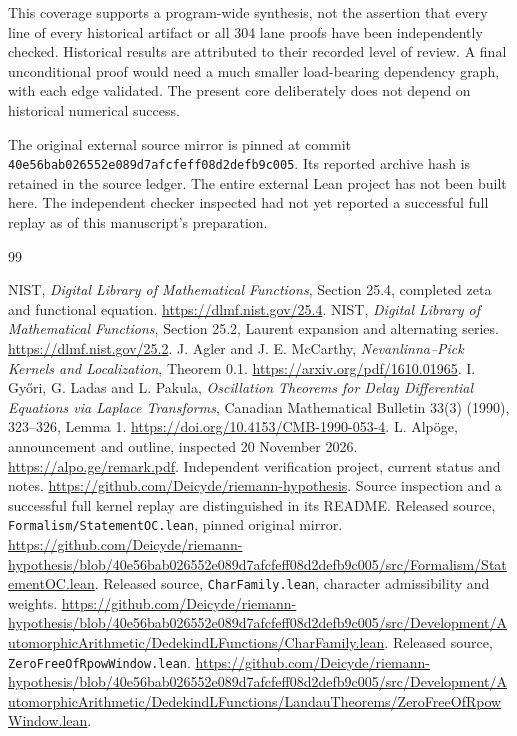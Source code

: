 \documentclass[11pt,letterpaper]{article}
\theoremstyle{definition}
\theoremstyle{remark}
\numberwithin{equation}{section}
\begin{document}
This coverage supports a program-wide synthesis, not the assertion that every line of every historical artifact or all 304 lane proofs have been independently checked. Historical results are attributed to their recorded level of review. A final unconditional proof would need a much smaller load-bearing dependency graph, with each edge validated. The present core deliberately does not depend on historical numerical success.

The original external source mirror is pinned at commit
\nolinkurl{40e56bab026552e089d7afcfeff08d2defb9c005}. Its reported archive hash is retained in the source ledger. The entire external Lean project has not been built here. The independent checker inspected had not yet reported a successful full replay as of this manuscript's preparation.

\begin{thebibliography}{99}
\raggedright
{} NIST, \emph{Digital Library of Mathematical Functions}, Section 25.4, completed zeta and functional equation. \url{https://dlmf.nist.gov/25.4}.
 NIST, \emph{Digital Library of Mathematical Functions}, Section 25.2, Laurent expansion and alternating series. \url{https://dlmf.nist.gov/25.2}.
 J. Agler and J. E. McCarthy, \emph{Nevanlinna--Pick Kernels and Localization}, Theorem 0.1. \url{https://arxiv.org/pdf/1610.01965}.
 I. Gy\H ori, G. Ladas and L. Pakula, \emph{Oscillation Theorems for Delay Differential Equations via Laplace Transforms}, Canadian Mathematical Bulletin 33(3) (1990), 323--326, Lemma 1. \url{https://doi.org/10.4153/CMB-1990-053-4}.
 L. Alp\"oge, announcement and outline, inspected 20 November 2026. \url{https://alpo.ge/remark.pdf}.
 Independent verification project, current status and notes. \url{https://github.com/Deicyde/riemann-hypothesis}. Source inspection and a successful full kernel replay are distinguished in its README.
 Released source, \texttt{Formalism/StatementOC.lean}, pinned original mirror. \url{https://github.com/Deicyde/riemann-hypothesis/blob/40e56bab026552e089d7afcfeff08d2defb9c005/src/Formalism/StatementOC.lean}.
 Released source, \texttt{CharFamily.lean}, character admissibility and weights. \url{https://github.com/Deicyde/riemann-hypothesis/blob/40e56bab026552e089d7afcfeff08d2defb9c005/src/Development/AutomorphicArithmetic/DedekindLFunctions/CharFamily.lean}.
 Released source, \texttt{ZeroFreeOfRpowWindow.lean}. \url{https://github.com/Deicyde/riemann-hypothesis/blob/40e56bab026552e089d7afcfeff08d2defb9c005/src/Development/AutomorphicArithmetic/DedekindLFunctions/LandauTheorems/ZeroFreeOfRpowWindow.lean}.

\end{thebibliography}
\end{document}
